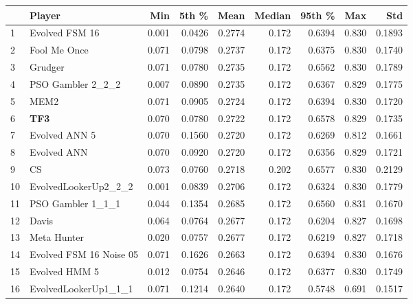 \begin{tabular}{llrrrrrrr}
\toprule
{} &                   Player &    Min &   5th \% &    Mean &  Median &  95th \% &    Max &     Std \\
\midrule
1  &           Evolved FSM 16 &  0.001 &  0.0426 &  0.2774 &   0.172 &  0.6394 &  0.830 &  0.1893 \\
2  &             Fool Me Once &  0.071 &  0.0798 &  0.2737 &   0.172 &  0.6375 &  0.830 &  0.1740 \\
3  &                  Grudger &  0.071 &  0.0780 &  0.2735 &   0.172 &  0.6562 &  0.830 &  0.1789 \\
4  &        PSO Gambler 2\_2\_2 &  0.007 &  0.0890 &  0.2735 &   0.172 &  0.6367 &  0.829 &  0.1775 \\
5  &                     MEM2 &  0.071 &  0.0905 &  0.2724 &   0.172 &  0.6394 &  0.830 &  0.1720 \\
6  &                      \textbf{TF3} &  0.070 &  0.0780 &  0.2722 &   0.172 &  0.6578 &  0.829 &  0.1735 \\
7  &            Evolved ANN 5 &  0.070 &  0.1560 &  0.2720 &   0.172 &  0.6269 &  0.812 &  0.1661 \\
8  &              Evolved ANN &  0.070 &  0.0920 &  0.2720 &   0.172 &  0.6356 &  0.829 &  0.1721 \\
9  &                       CS &  0.073 &  0.0760 &  0.2718 &   0.202 &  0.6577 &  0.830 &  0.2129 \\
10 &     EvolvedLookerUp2\_2\_2 &  0.001 &  0.0839 &  0.2706 &   0.172 &  0.6324 &  0.830 &  0.1779 \\
11 &        PSO Gambler 1\_1\_1 &  0.044 &  0.1354 &  0.2685 &   0.172 &  0.6560 &  0.831 &  0.1670 \\
12 &                    Davis &  0.064 &  0.0764 &  0.2677 &   0.172 &  0.6204 &  0.827 &  0.1698 \\
13 &              Meta Hunter &  0.020 &  0.0757 &  0.2677 &   0.172 &  0.6219 &  0.827 &  0.1718 \\
14 &  Evolved FSM 16 Noise 05 &  0.071 &  0.1626 &  0.2663 &   0.172 &  0.6394 &  0.830 &  0.1676 \\
15 &            Evolved HMM 5 &  0.012 &  0.0754 &  0.2646 &   0.172 &  0.6377 &  0.830 &  0.1749 \\
16 &     EvolvedLookerUp1\_1\_1 &  0.071 &  0.1214 &  0.2640 &   0.172 &  0.5748 &  0.691 &  0.1517 \\
\bottomrule
\end{tabular}
